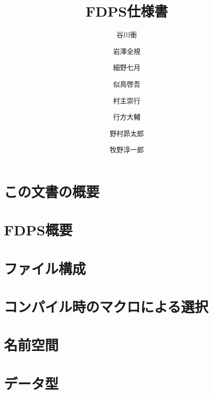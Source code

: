 \documentclass[12pt,a4paper]{jarticle}
\title{FDPS仕様書}
\author{谷川衝}
\author{岩澤全規}
\author{細野七月}
\author{似鳥啓吾}
\author{村主崇行}
\author{行方大輔}
\author{野村昴太郎}
\author{牧野淳一郎}
\affil{理化学研究所 計算科学研究センター 粒子系シミュレータ研究チーム}
\date{}
\begin{document}
\maketitle
\tableofcontents

\newpage

\section{この文書の概要}



\newpage

\section{FDPS概要}
\label{sec:overview}



\newpage

\section{ファイル構成}
\label{sec:configuration}



\newpage

\section{コンパイル時のマクロによる選択}
\label{sec:compile}



\newpage

\section{名前空間}
\label{sec:namespace}



\newpage

\section{データ型}
\label{sec:datatype}
\end{document}

